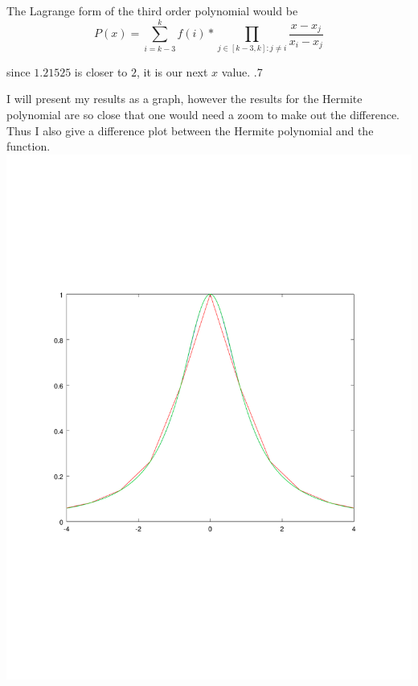 \documentclass[12pt]{article}
\makeatletter
\theoremstyle{homework}
\newenvironment{exercise}[1]
{\def\@currentlabel{#1}\exercisecore}
{\endexercisecore}
\makeatother
\begin{document}
The Lagrange form of the third order polynomial would be 
$$P(x)=\sum_{i=k-3}^{k}f(i)*\prod_{j\in[k-3,k]:j\neq i}\frac{x-x_j}{x_i-x_j}$$

since $1.21525$ is closer to $2$, it is our next $x$ value.
\begin{exercise}

8.7
\end{exercise}


I will present my results as a graph, however the results for the Hermite polynomial are so close that one would need a zoom to make out the difference.  Thus I also give a difference plot between the Hermite polynomial and the function.\\
\includegraphics[scale=.7]{../octave/herm.pdf}\\
\end{document}
